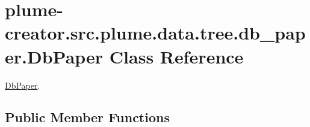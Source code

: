 \hypertarget{classplume-creator_1_1src_1_1plume_1_1data_1_1tree_1_1db__paper_1_1_db_paper}{}\section{plume-\/creator.src.\+plume.\+data.\+tree.\+db\+\_\+paper.\+Db\+Paper Class Reference}
\label{classplume-creator_1_1src_1_1plume_1_1data_1_1tree_1_1db__paper_1_1_db_paper}


\hyperlink{classplume-creator_1_1src_1_1plume_1_1data_1_1tree_1_1db__paper_1_1_db_paper}{Db\+Paper}.  


\subsection*{Public Member Functions}
